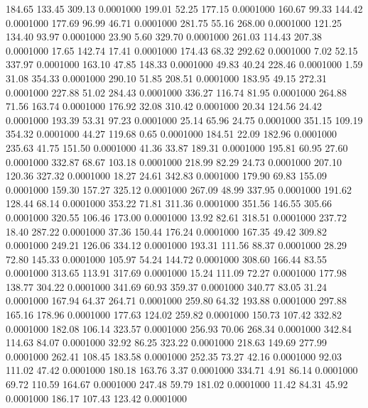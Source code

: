  184.65  133.45  309.13   0.0001000
 199.01   52.25  177.15   0.0001000
 160.67   99.33  144.42   0.0001000
 177.69   96.99   46.71   0.0001000
 281.75   55.16  268.00   0.0001000
 121.25  134.40   93.97   0.0001000
  23.90    5.60  329.70   0.0001000
 261.03  114.43  207.38   0.0001000
  17.65  142.74   17.41   0.0001000
 174.43   68.32  292.62   0.0001000
   7.02   52.15  337.97   0.0001000
 163.10   47.85  148.33   0.0001000
  49.83   40.24  228.46   0.0001000
   1.59   31.08  354.33   0.0001000
 290.10   51.85  208.51   0.0001000
 183.95   49.15  272.31   0.0001000
 227.88   51.02  284.43   0.0001000
 336.27  116.74   81.95   0.0001000
 264.88   71.56  163.74   0.0001000
 176.92   32.08  310.42   0.0001000
  20.34  124.56   24.42   0.0001000
 193.39   53.31   97.23   0.0001000
  25.14   65.96   24.75   0.0001000
 351.15  109.19  354.32   0.0001000
  44.27  119.68    0.65   0.0001000
 184.51   22.09  182.96   0.0001000
 235.63   41.75  151.50   0.0001000
  41.36   33.87  189.31   0.0001000
 195.81   60.95   27.60   0.0001000
 332.87   68.67  103.18   0.0001000
 218.99   82.29   24.73   0.0001000
 207.10  120.36  327.32   0.0001000
  18.27   24.61  342.83   0.0001000
 179.90   69.83  155.09   0.0001000
 159.30  157.27  325.12   0.0001000
 267.09   48.99  337.95   0.0001000
 191.62  128.44   68.14   0.0001000
 353.22   71.81  311.36   0.0001000
 351.56  146.55  305.66   0.0001000
 320.55  106.46  173.00   0.0001000
  13.92   82.61  318.51   0.0001000
 237.72   18.40  287.22   0.0001000
  37.36  150.44  176.24   0.0001000
 167.35   49.42  309.82   0.0001000
 249.21  126.06  334.12   0.0001000
 193.31  111.56   88.37   0.0001000
  28.29   72.80  145.33   0.0001000
 105.97   54.24  144.72   0.0001000
 308.60  166.44   83.55   0.0001000
 313.65  113.91  317.69   0.0001000
  15.24  111.09   72.27   0.0001000
 177.98  138.77  304.22   0.0001000
 341.69   60.93  359.37   0.0001000
 340.77   83.05   31.24   0.0001000
 167.94   64.37  264.71   0.0001000
 259.80   64.32  193.88   0.0001000
 297.88  165.16  178.96   0.0001000
 177.63  124.02  259.82   0.0001000
 150.73  107.42  332.82   0.0001000
 182.08  106.14  323.57   0.0001000
 256.93   70.06  268.34   0.0001000
 342.84  114.63   84.07   0.0001000
  32.92   86.25  323.22   0.0001000
 218.63  149.69  277.99   0.0001000
 262.41  108.45  183.58   0.0001000
 252.35   73.27   42.16   0.0001000
  92.03  111.02   47.42   0.0001000
 180.18  163.76    3.37   0.0001000
 334.71    4.91   86.14   0.0001000
  69.72  110.59  164.67   0.0001000
 247.48   59.79  181.02   0.0001000
  11.42   84.31   45.92   0.0001000
 186.17  107.43  123.42   0.0001000
